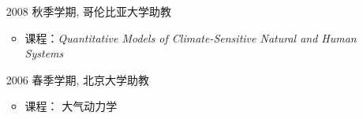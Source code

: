 \documentclass[11pt]{article}
\begin{document}
\begin{CJK*}{UTF8}{gkai}
\begin{itemize}[leftmargin=10ex,label={},noitemsep,nolistsep]
	\item[2008] 秋季学期, 哥伦比亚大学助教
	\begin{itemize}[leftmargin=0ex,label={},noitemsep,nolistsep]
		\item 课程：\textit{Quantitative Models of Climate-Sensitive Natural and Human Systems}
		\end{itemize}
		
	\item[2006] 春季学期, 北京大学助教
	\begin{itemize}[leftmargin=0ex,label={},noitemsep,nolistsep]
		\item 课程： 大气动力学 %
		\end{itemize}
	\end{itemize}





\end{CJK*}
\end{document}
